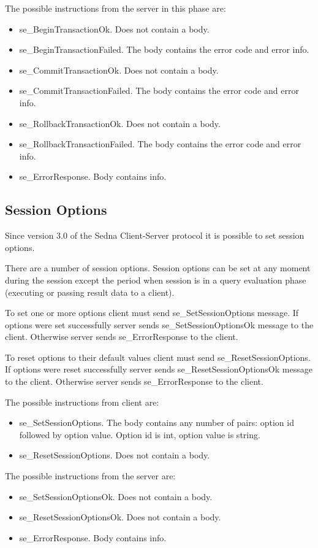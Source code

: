 \documentclass[a4paper,12pt]{article}
\begin{document}
The possible instructions from the server in this phase are:
\begin{itemize}
\item se\_BeginTransactionOk. Does not contain a body.
\item se\_BeginTransactionFailed. The body contains the error code and error info.
\item se\_CommitTransactionOk. Does not contain a body.
\item se\_CommitTransactionFailed. The body contains the error code and error info.
\item se\_RollbackTransactionOk. Does not contain a body.
\item se\_RollbackTransactionFailed. The body contains the error code and error info.
\item se\_ErrorResponse. Body contains info.
\end{itemize} 

\subsection{Session Options}
Since version 3.0 of the Sedna Client-Server protocol it is possible to set session options.

There are a number of session options. Session options can be set at any moment during the session except the period when session is in a query evaluation phase (executing or passing result data to a client).

To set one or more options client must send se\_SetSessionOptions message. If options were set successfully server sends se\_SetSessionOptionsOk message to the client. Otherwise server sends se\_ErrorResponse to the client.

To reset options to their default values client must send se\_ResetSessionOptions. If options were reset successfully server sends se\_ResetSessionOptionsOk message to the client. Otherwise server sends se\_ErrorResponse to the client.

The possible instructions from client are:
\begin{itemize}
\item se\_SetSessionOptions. The body contains any number of pairs: option id followed by option value. Option id is int, option value is string.
\item se\_ResetSessionOptions. Does not contain a body.
\end{itemize} 

The possible instructions from the server are:
\begin{itemize}
\item se\_SetSessionOptionsOk. Does not contain a body.
\item se\_ResetSessionOptionsOk. Does not contain a body.
\item se\_ErrorResponse. Body contains info.
\end{itemize} 
\end{document}
